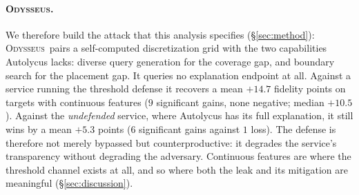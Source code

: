 \documentclass[sigconf,anonymous,review]{acmart}
\newcommand{\sys}{\textsc{Odysseus}}
\newcommand{\TODO}[1]{\textcolor{red}{[TODO: #1]}}
\begin{document}
\paragraph{\sys.} 
We therefore build the attack that this analysis specifies (\S\ref{sec:method}):
\sys\ pairs a self-computed discretization grid with the two capabilities Autolycus lacks: diverse query generation for the coverage gap, and boundary search for the placement gap. It queries no
explanation endpoint at all. Against a service running the threshold defense it recovers
a mean $+14.7$ fidelity points on targets with continuous features ($9$ significant gains, none
negative; median $+10.5$). Against the \emph{undefended} service, where Autolycus has its full
explanation, it still wins by a mean $+5.3$ points ($6$ significant gains against $1$ loss). The defense is therefore not merely bypassed but counterproductive: it degrades the
service's transparency without degrading the adversary. Continuous features are where the threshold
channel exists at all, and so where both the leak and its mitigation are meaningful
(\S\ref{sec:discussion}).
\end{document}
